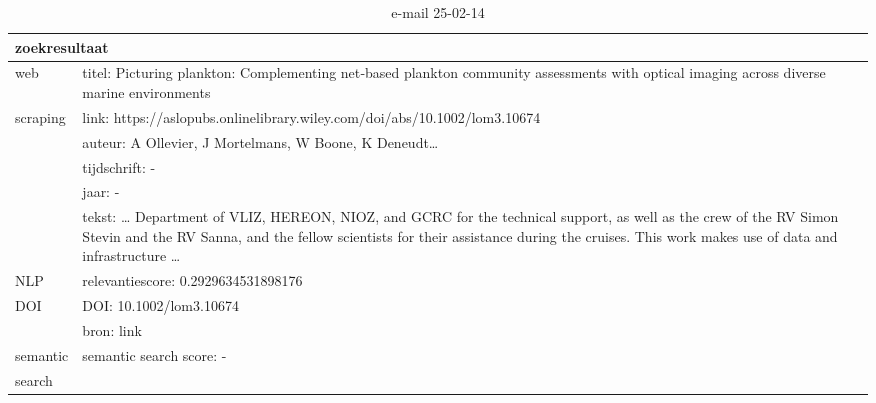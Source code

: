\begin{table}[h!]
    \caption{e-mail 25-02-14}
    \centering
    \begin{tabularx}{\textwidth}{|p{4cm}|X|} 
        \hline
        \multicolumn{2}{|X|}{\textbf{zoekresultaat}} \\
        \hline
        web &titel: Picturing plankton: Complementing net‐based plankton community assessments with optical imaging across diverse marine environments\\
        scraping&link: https://aslopubs.onlinelibrary.wiley.com/doi/abs/10.1002/lom3.10674\\
        &auteur: A Ollevier, J Mortelmans, W Boone, K Deneudt…\\
        &tijdschrift: -\\
        &jaar: -\\
        &tekst: … Department of VLIZ, HEREON, NIOZ, and GCRC for the technical support, as well as the crew of the RV Simon Stevin and the RV Sanna, and the fellow scientists for their assistance during the cruises. This work makes use of data and infrastructure …\\
        \hline
        NLP&relevantiescore: 0.2929634531898176\\
        \hline
        DOI&DOI: 10.1002/lom3.10674\\
        &bron: link\\
        \hline
        semantic&semantic search score: -\\
        search&\\
        \hline
    \end{tabularx}
    \label{table:email20250214}
\end{table}
